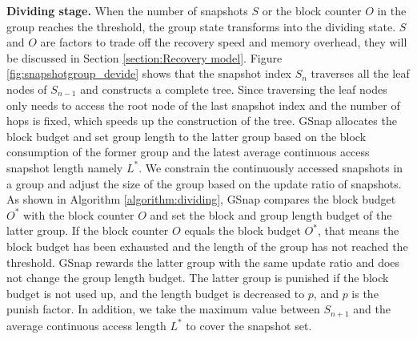 \documentclass[sigconf, nonacm]{acmart}
\begin{document}
\textbf{Dividing stage.} When the number of snapshots $S$ or the block counter $O$ in the group reaches the threshold, the group state transforms into the dividing state. $S$ and $O$ are factors to trade off the recovery speed and memory overhead, they will be discussed in Section \ref{section:Recovery model}. Figure \ref{fig:snapshotgroup_devide} shows that the snapshot index $S_n$ traverses all the leaf nodes of $S_{n-1}$ and constructs a complete tree. Since traversing the leaf nodes only needs to access the root node of the last snapshot index and the number of hops is fixed, which speeds up the construction of the tree.
GSnap allocates the block budget and set group length to the latter group based on the block consumption of the former group and the latest average continuous access snapshot length namely $L^\ast$. 
We constrain the continuously accessed snapshots in a group and adjust the size of the group based on the update ratio of snapshots.
As shown in Algorithm \ref{algorithm:dividing}, GSnap compares the block budget $O^\ast$ with the block counter $O$ and set the block and group length budget of the latter group. If the block counter $O$ equals the block budget $O^\ast$, that means the block budget has been exhausted and the length of the group has not reached the threshold. GSnap rewards the latter group with the same update ratio and does not change the group length budget. The latter group is punished if the block budget is not used up, and the length budget is decreased to $p$, and $p$ is the punish factor. In addition, we take the maximum value between $S_{n+1}$ and the average continuous access length  $L^\ast$ to cover the snapshot set.
\end{document}
